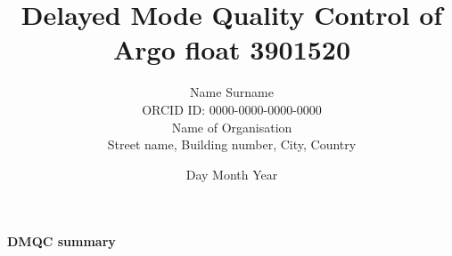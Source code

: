 \documentclass{article}
\newcommand{\WMOnum}{3901520} %
\begin{document}
\title{Delayed Mode Quality Control of Argo float \WMOnum\hspace{0.5mm}}
\author{Name Surname\\   %
ORCID ID: 0000-0000-0000-0000\vspace{1cm}\\
Name of Organisation\\
Street name, Building number, City, Country} %

\date{Day Month Year} %
\maketitle

\vspace{3cm}
\begin{center}
	\bf{DMQC summary}
\end{center}
\end{document}
